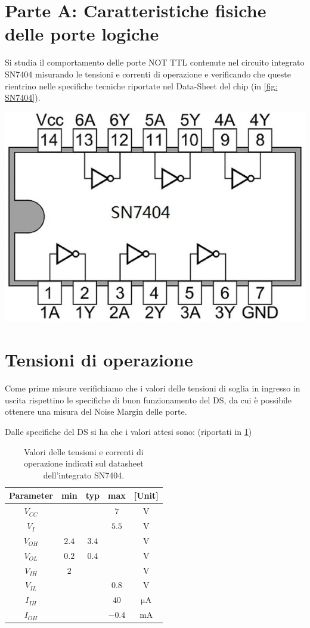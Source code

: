 \documentclass[10pt, a4paper, italian]{article}
\begin{document}
\section*{Parte A: Caratteristiche fisiche delle porte logiche}
Si studia il comportamento delle porte NOT TTL contenute nel circuito integrato
SN7404 misurando le tensioni e correnti di operazione e verificando che queste
rientrino nelle specifiche tecniche riportate nel Data-Sheet del chip
(in \cref{fig: SN7404}).
\begin{minipage}{0.3\textwidth}
    \includegraphics[width=\textwidth]{SN7404}
    \label{fig: SN7404}
\end{minipage}

\section{Tensioni di operazione}\label{sec: tens}
Come prime misure verifichiamo che i valori delle tensioni di soglia in
ingresso in uscita rispettino le specifiche di buon funzionamento del DS,
da cui è possibile ottenere una misura del Noise Margin delle porte.

Dalle specifiche del DS si ha che i valori attesi sono: (riportati in
\cref{tab: notDS})
\begin{table}[htb]
\centering
\begin{tabular}{cccc|c}
\toprule
Parameter  & min & typ & max & [Unit] \\
\midrule
\midrule
$V_{CC}$ &  &  & $7$ & V \\
$V_I$	 &  &  & $5.5$ & V\\
$V_{OH}$ & $2.4$  & $3.4$ & & V \\
$V_{OL}$ & $0.2$  & $0.4$ & & V \\
$V_{IH}$ & $2$  &  & & V  \\
$V_{IL}$ &  &  & $0.8$ & V \\
$I_{IH}$ &  &  & $40$ & $\si{\micro\A}$ \\
$I_{OH}$ &  &  & $-0.4$ & mA \\
\bottomrule 
\end{tabular}
\caption{Valori delle tensioni e correnti di operazione indicati sul
datasheet dell'integrato SN7404.}
\label{tab: notDS}
\end{table}
\end{document}
